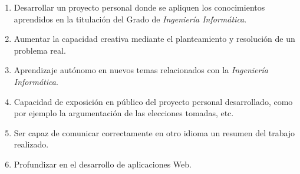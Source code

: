 \begin{enumerate}
    \item Desarrollar un proyecto personal donde se apliquen los conocimientos aprendidos en la titulación del Grado de \textit{Ingeniería Informática}.
    \item Aumentar la capacidad creativa mediante el planteamiento y resolución de un problema real. 
    \item Aprendizaje autónomo en nuevos temas relacionados con la \textit{Ingeniería Informática}.
    \item Capacidad de exposición en público del proyecto personal desarrollado, como por ejemplo la argumentación de las elecciones tomadas, etc. 
    \item Ser capaz de comunicar correctamente en otro idioma un resumen del trabajo realizado.
    \item Profundizar en el desarrollo de aplicaciones Web.
\end{enumerate}



